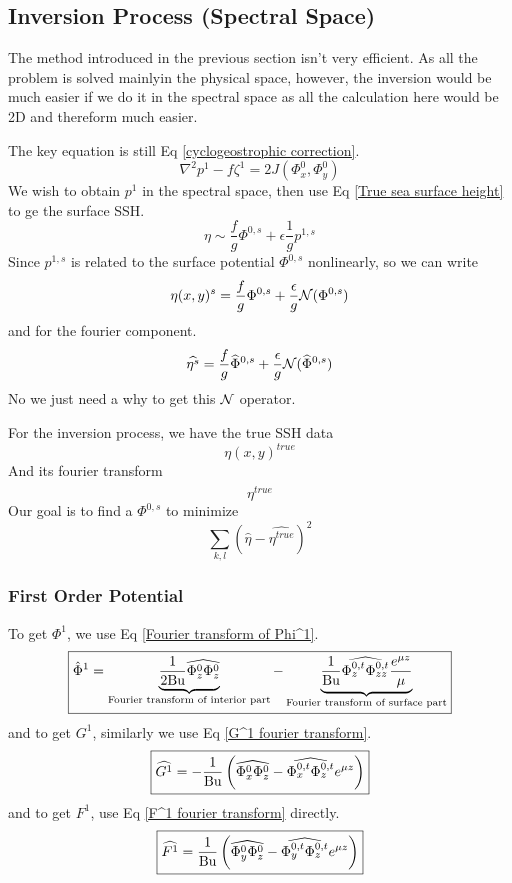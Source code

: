 \documentclass[../SQG_notes.tex]{subfiles}
\begin{document}
\subsection{Inversion Process (Spectral Space)}

The method introduced in the previous section isn't very efficient. As all the problem is solved mainlyin the physical space, however, the inversion would be much easier if we do it in the spectral space as all the calculation here would be 2D and thereform much easier. \par

The key equation is still Eq \ref{cyclogeostrophic correction}. 
\[ \nabla^2 p^1 - f \zeta^1 = 2J(\Phi_x^0, \Phi_y^0) \]
We wish to obtain $p^1$ in the spectral space, then use Eq \ref{True sea surface height} to ge the surface SSH. 
\[ \eta \sim \frac{f}{g} \Phi^{0,s} + \epsilon\frac{1}{g} p^{1, s} \]
Since $p^{1,s}$ is related to the surface potential $\Phi^{0,s}$ nonlinearly, so we can write 
\[ \eta(x,y)^s = \frac{f}{g}\Phi^{0,s} + \frac{\epsilon}{g} \mathcal{N}(\Phi^{0,s}) \]
and for the fourier component. 
\[ \widehat{\eta^s} = \frac{f}{g}\widehat{\Phi}^{0,s} + \frac{\epsilon}{g}\mathcal{N}(\widehat{\Phi}^{0,s})\]
No we just need a why to get this $\mathcal{N}$ operator. \par
For the inversion process, we have the true SSH data 
\[ \eta(x,y)^{true}\]
And its fourier transform 
\[ \widehat{\eta^{true}}\]
Our goal is to find a $\Phi^{0,s}$ to minimize 
\[ \sum_{k, l} \left( \hat{\eta} - \hat{\eta^{true}}\right)^2\]
\subsubsection{First Order Potential}
To get $\Phi^1$, we use Eq \ref{Fourier transform of Phi^1}. 
\[  \boxed{\hat{\Phi}^1 =\underbrace{\frac{1}{2 \text{Bu}} \widehat{\Phi_z^0 \Phi_z^0}}_{\text{Fourier transform of interior part}} - \underbrace{\frac{1}{\text{Bu}} \widehat{\Phi_z^{0,t} \Phi_{zz}^{0,t}} \frac{e^{\mu z}}{\mu}}_{\text{Fourier transform of surface part}} }\]
and to get $G^1$, similarly we use Eq \ref{G^1 fourier transform}. 
\[ \boxed{    \widehat{G^1} = -\frac{1}{\text{Bu}} \left( \widehat{\Phi_x^0\Phi_z^0} - \widehat{\Phi_x^{0,t}\Phi_z^{0,t}} e^{\mu z}\right) }\]
and to get $F^1$, use Eq \ref{F^1 fourier transform} directly. 
\[ \boxed{   \widehat{F^1} = \frac{1}{\text{Bu}} \left( \widehat{\Phi_y^0\Phi_z^0} - \widehat{\Phi_y^{0,t}\Phi_z^{0,t}} e^{\mu z}\right)}\]
\end{document}
